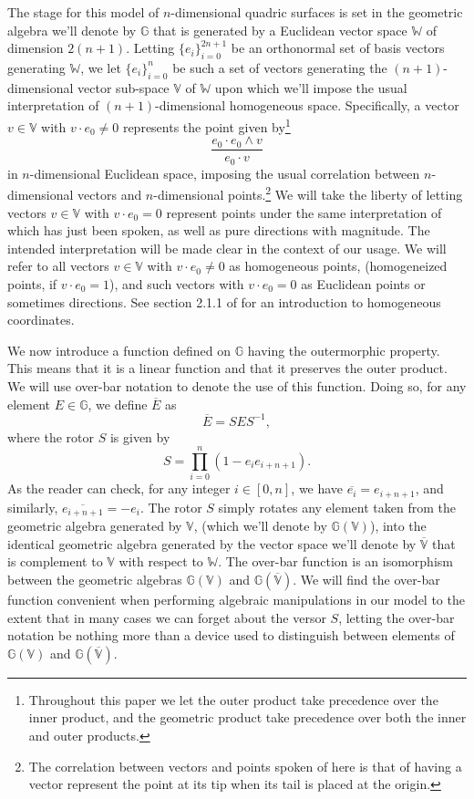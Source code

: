 \documentclass{birkjour}
\theoremstyle{definition}
\theoremstyle{remark}
\numberwithin{equation}{section}
\newcommand{\G}{\mathbb{G}}
\newcommand{\V}{\mathbb{V}}
\newcommand{\W}{\mathbb{W}}
\begin{document}
The stage for this model of $n$-dimensional quadric surfaces is set in the geometric
algebra we'll denote by $\G$ that is generated by a Euclidean vector space $\W$ of dimension
$2(n+1)$.  Letting $\{e_i\}_{i=0}^{2n+1}$ be an orthonormal set of basis vectors
generating $\W$, we let $\{e_i\}_{i=0}^n$ be such a set of vectors generating
the $(n+1)$-dimensional vector sub-space $\V$ of $\W$ upon which we'll impose the
usual interpretation of $(n+1)$-dimensional homogeneous space.  Specifically,
a vector $v\in\V$ with $v\cdot e_0\neq 0$ represents the point given by\footnote{Throughout this
paper we let the outer product take precedence over the inner product, and the geometric product
take precedence over both the inner and outer products.}
\begin{equation}
\frac{e_0\cdot e_0\wedge v}{e_0\cdot v}
\end{equation}
in $n$-dimensional Euclidean space, imposing the usual correlation between $n$-dimensional
vectors and $n$-dimensional points.\footnote{The correlation between
vectors and points spoken of here is that of having a vector represent the point
at its tip when its tail is placed at the origin.}  We will take the liberty of letting vectors $v\in\V$ with $v\cdot e_0=0$
represent points under the same interpretation of which has just been spoken, as
well as pure directions with magnitude.  The intended interpretation will be made clear
in the context of our usage.  We will refer to all vectors $v\in\V$ with $v\cdot e_0\neq 0$
as homogeneous points, (homogeneized points, if $v\cdot e_0=1$), and such vectors with
$v\cdot e_0=0$ as Euclidean points or sometimes directions.
See section 2.1.1 of \cite{Birchfield98} for an introduction to homogeneous coordinates.

We now introduce a function defined on $\G$ having the outermorphic property.
This means that it is a linear function and that it preserves the outer product.  We will
use over-bar notation to denote the use of this function.  Doing so, for any
element $E\in\G$, we define $\overline{E}$ as
\begin{equation}
\overline{E} = SES^{-1},
\end{equation}
where the rotor $S$ is given by
\begin{equation}
S = \prod_{i=0}^n\left(1-e_ie_{i+n+1}\right).
\end{equation}
As the reader can check, for any integer $i\in[0,n]$, we have $\overline{e_i}=e_{i+n+1}$,
and similarly, $\overline{e_{i+n+1}}=-e_i$.
The rotor $S$ simply rotates any element taken from the geometric algebra generated
by $\V$, (which we'll denote by $\G(\V)$), into the identical geometric
algebra generated by the vector
space we'll denote by $\overline{\V}$ that is complement to $\V$ with respect to $\W$.
The over-bar function is an isomorphism between the geometric algebras $\G(\V)$ and $\G(\overline{\V})$.
We will find the over-bar function convenient when performing algebraic manipulations in our model
to the extent that in many cases we can forget about the versor $S$, letting the over-bar notation be nothing
more than a device used to distinguish between elements of $\G(\V)$ and $\G(\overline{\V})$.
\end{document}
